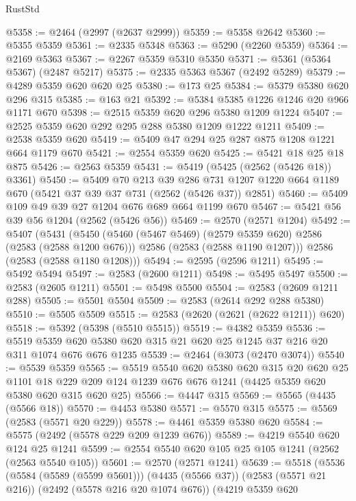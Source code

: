 \begin{lexlean}{RustStd}
\begin{coremodule}
@5358 := @2464 (@2997 (@2637 @2999))
@5359 := @5358 @2642
@5360 := @5355 @5359
@5361 := @2335 @5348
@5363 := @5290 (@2260 @5359)
@5364 := @2169 @5363
@5367 := @2267 @5359 @5310 @5350
@5371 := @5361 (@5364 @5367) (@2487 @5217)
@5375 := @2335 @5363 @5367 (@2492 @5289)
@5379 := @4289 @5359 @620 @620 @25
@5380 := @173 @25
@5384 := @5379 @5380 @620 @296 @315
@5385 := @163 @21
@5392 := @5384 @5385 @1226 @1246 @20 @966 @1171 @670
@5398 := @2515 @5359 @620 @296 @5380 @1209 @1224
@5407 := @2525 @5359 @620 @292 @295 @288 @5380 @1209 @1222 @1211
@5409 := @2538 @5359 @620
@5419 := @5409 @47 @294 @25 @287 @875 @1208 @1221 @664 @1179 @670
@5421 := @2554 @5359 @620
@5425 := @5421 @18 @25 @18 @875
@5426 := @2563 @5359
@5431 := @5419 (@5425 (@2562 (@5426 @18)) @3361)
@5450 := @5409
    @70
    @213
    @39
    @286
    @731
    @1207
    @1220
    @664
    @1189
    @670
    (@5421 @37 @39 @37 @731 (@2562 (@5426 @37)) @2851)
@5460 := @5409 @109 @49 @39 @27 @1204 @676 @689 @664 @1199 @670
@5467 := @5421 @56 @39 @56 @1204 (@2562 (@5426 @56))
@5469 := @2570 (@2571 @1204)
@5492 := @5407
    (@5431
      (@5450
        (@5460 (@5467 @5469) (@2579 @5359 @620) @2586 (@2583 (@2588 @1200 @676)))
        @2586
        (@2583 (@2588 @1190 @1207)))
      @2586
      (@2583 (@2588 @1180 @1208)))
@5494 := @2595 (@2596 @1211)
@5495 := @5492 @5494
@5497 := @2583 (@2600 @1211)
@5498 := @5495 @5497
@5500 := @2583 (@2605 @1211)
@5501 := @5498 @5500
@5504 := @2583 (@2609 @1211 @288)
@5505 := @5501 @5504
@5509 := @2583 (@2614 @292 @288 @5380)
@5510 := @5505 @5509
@5515 := @2583 (@2620 (@2621 (@2622 @1211)) @620)
@5518 := @5392 (@5398 (@5510 @5515))
@5519 := @4382 @5359
@5536 := @5519 @5359 @620 @5380 @620 @315 @21 @620 @25 @1245 @37 @216 @20 @311 @1074 @676 @676 @1235
@5539 := @2464 (@3073 (@2470 @3074))
@5540 := @5539 @5359
@5565 := @5519
    @5540
    @620
    @5380
    @620
    @315
    @20
    @620
    @25
    @1101
    @18
    @229
    @209
    @124
    @1239
    @676
    @676
    @1241
    (@4425 @5359 @620 @5380 @620 @315 @620 @25)
@5566 := @4447 @315
@5569 := @5565 (@4435 (@5566 @18))
@5570 := @4453 @5380
@5571 := @5570 @315
@5575 := @5569 (@2583 (@5571 @20 @229))
@5578 := @4461 @5359 @5380 @620
@5584 := @5575 (@2492 (@5578 @229 @209 @1239 @676))
@5589 := @4219 @5540 @620 @124 @25 @1241
@5599 := @2554 @5540 @620 @105 @25 @105 @1241 (@2562 (@2563 @5540 @105))
@5601 := @2570 (@2571 @1241)
@5639 := @5518
    (@5536
      (@5584 (@5589 (@5599 @5601)))
      (@4435 (@5566 @37))
      (@2583 (@5571 @21 @216))
      (@2492 (@5578 @216 @20 @1074 @676))
      (@4219
        @5359
        @620

\end{coremodule}
\end{lexlean}
